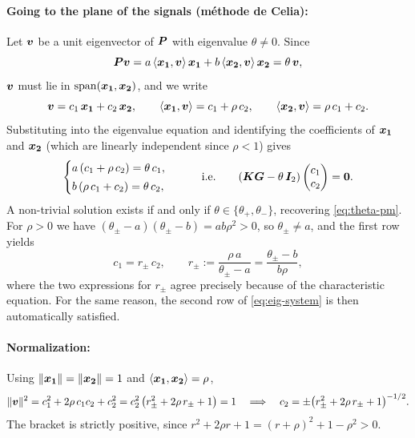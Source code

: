 \documentclass[11pt]{article}
\begin{document}
\paragraph{Going to the plane of the signals (méthode de Celia):} Let $\bm{v}$ be a unit eigenvector of $\bm{P}$ with eigenvalue $\theta \neq 0$. Since
\begin{equation}
    \bm{P} \bm{v} = a\,\langle \bm{x_1}, \bm{v}\rangle\,\bm{x_1} + b\,\langle \bm{x_2}, \bm{v}\rangle\,\bm{x_2} = \theta\,\bm{v} ,
\end{equation}
$\bm{v}$ must lie in $\operatorname{span}(\bm{x_1},\bm{x_2})$, and we write
\begin{equation}
    \bm{v} = c_1\,\bm{x_1} + c_2\,\bm{x_2},
    \qquad
    \langle \bm{x_1}, \bm{v}\rangle = c_1 + \rho\, c_2,
    \qquad
    \langle \bm{x_2}, \bm{v}\rangle = \rho\, c_1 + c_2 .
    \label{eq:ansatz}
\end{equation}
Substituting into the eigenvalue equation and identifying the coefficients of $\bm{x_1}$ and $\bm{x_2}$ (which are linearly independent since $\rho < 1$) gives
\begin{equation}
    \begin{cases}
        a\,(c_1 + \rho\, c_2) = \theta\, c_1 ,\\[2pt]
        b\,(\rho\, c_1 + c_2) = \theta\, c_2 ,
    \end{cases}
    \qquad \text{i.e.} \qquad
    (\bm{K} \bm{G} - \theta\, \bm{I}_2)\begin{pmatrix} c_1 \\ c_2 \end{pmatrix} = \bm{0} .
    \label{eq:eig-system}
\end{equation}
A non-trivial solution exists if and only if $\theta \in \{\theta_+, \theta_-\}$, recovering \eqref{eq:theta-pm}. For $\rho > 0$ we have $(\theta_\pm - a)(\theta_\pm - b) = ab\rho^2 > 0$, so $\theta_\pm \neq a$, and the first row yields
\begin{equation}
    c_1 = r_\pm\, c_2,
    \qquad
    r_\pm := \frac{\rho\, a}{\theta_\pm - a} = \frac{\theta_\pm - b}{b\rho},
    \label{eq:ratio}
\end{equation}
where the two expressions for $r_\pm$ agree precisely because of the characteristic equation. For the same reason, the second row of \eqref{eq:eig-system} is then automatically satisfied.

\paragraph{Normalization:} Using $ \|\bm{x_1} \| =  \|\bm{x_2} \| = 1$ and $\langle \bm{x_1},\bm{x_2}\rangle = \rho$,
\begin{equation}
     \|\bm{v} \|^2 = c_1^2 + 2\rho\, c_1 c_2 + c_2^2
    = c_2^2\,\big( r_\pm^2 + 2\rho\, r_\pm + 1 \big) = 1
    \quad \Longrightarrow \quad
    c_2 = \pm \big( r_\pm^2 + 2\rho\, r_\pm + 1 \big)^{-1/2} .
\end{equation}
The bracket is strictly positive, since $r^2 + 2\rho r + 1 = (r+\rho)^2 + 1 - \rho^2 > 0$.
\end{document}
